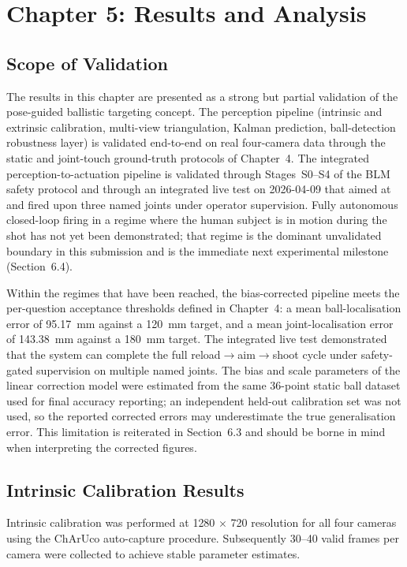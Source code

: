 \chapter{Chapter 5: Results and Analysis}

\section*{Scope of Validation}

The results in this chapter are presented as a strong but partial validation of the pose-guided ballistic targeting concept. The perception pipeline (intrinsic and extrinsic calibration, multi-view triangulation, Kalman prediction, ball-detection robustness layer) is validated end-to-end on real four-camera data through the static and joint-touch ground-truth protocols of Chapter~4. The integrated perception-to-actuation pipeline is validated through Stages~S0--S4 of the BLM safety protocol and through an integrated live test on 2026-04-09 that aimed at and fired upon three named joints under operator supervision. Fully autonomous closed-loop firing in a regime where the human subject is in motion during the shot has not yet been demonstrated; that regime is the dominant unvalidated boundary in this submission and is the immediate next experimental milestone (Section~6.4).

Within the regimes that have been reached, the bias-corrected pipeline meets the per-question acceptance thresholds defined in Chapter~4: a mean ball-localisation error of 95.17~mm against a 120~mm target, and a mean joint-localisation error of 143.38~mm against a 180~mm target. The integrated live test demonstrated that the system can complete the full reload$\to$aim$\to$shoot cycle under safety-gated supervision on multiple named joints. The bias and scale parameters of the linear correction model were estimated from the same 36-point static ball dataset used for final accuracy reporting; an independent held-out calibration set was not used, so the reported corrected errors may underestimate the true generalisation error. This limitation is reiterated in Section~6.3 and should be borne in mind when interpreting the corrected figures.

\section{Intrinsic Calibration Results}

Intrinsic calibration was performed at 1280 \(\times\) 720 resolution for all four cameras using the ChArUco auto-capture procedure. Subsequently 30--40 valid frames per camera were collected to achieve stable parameter estimates.

